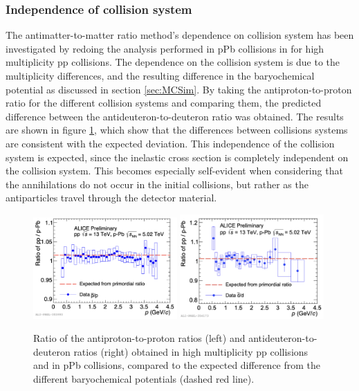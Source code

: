 \subsubsection{Independence of collision system}
The antimatter-to-matter ratio method's dependence on collision system has been investigated by redoing the analysis performed in pPb collisions in \cite{dbarIvan} for high multiplicity pp collisions. The dependence on the collision system is due to the multiplicity differences, and the resulting difference in the baryochemical potential as discussed in section \ref{sec:MCSim}. By taking the antiproton-to-proton ratio for the different collision systems and comparing them, the predicted difference between the antideuteron-to-deuteron ratio was obtained. The results are shown in figure \ref{fig:pp_pPb_dbardRatio}, which show that the differences between collisions systems are consistent with the expected deviation. This independence of the collision system is expected, since the inelastic cross section is completely independent on the collision system. This becomes especially self-evident when considering that the annihilations do not occur in the initial collisions, but rather as the antiparticles travel through the detector material.

\begin{figure}
    \centering
    \includegraphics[width=0.49\textwidth]{figures/antiproton-to-proton-ratio-pp-pPb-comparison.png}
    \includegraphics[width=0.49\textwidth]{figures/antideuteron-to-deuteron-ratio-comparison-pp-pPb.png}
    \caption{Ratio of the antiproton-to-proton ratios (left) and antideuteron-to-deuteron ratios (right) obtained in high multiplicity pp collisions and in pPb collisions, compared to the expected difference from the different baryochemical potentials (dashed red line).}
    \label{fig:pp_pPb_dbardRatio}
\end{figure}

